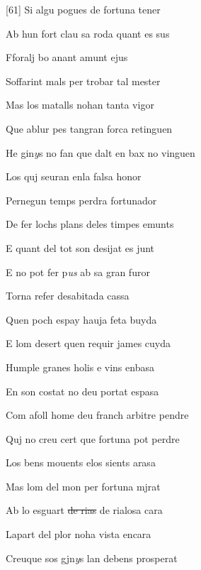\documentclass[12pt]{article}
\begin{document}
\begin{estrofa}

 [61] Si algu pogues de fortuna tener

 Ab hun fort clau sa roda quant es sus

 Fforalj bo anant amunt ejus

 Soffarint mals per trobar tal mester

 Mas los matalls nohan tanta vigor

 Que ablur pes tangran forca retinguen

 He gin\textit{y}s no fan que dalt en bax no vinguen

 Los quj seuran enla falsa honor

\end{estrofa}



\begin{estrofa}

 Pernegun temps perdra fortunador

 De fer lochs plans deles timpes emunts

 E quant del tot son desijat es junt

 E no pot fer p\textit{us }ab sa gran furor

 Torna refer desabitada cassa

 Quen poch espay hauja feta buyda

 E lom desert quen requir james cuyda

 Humple granes holis e vins enbasa

\end{estrofa}



\begin{estrofa}

 En son costat no deu portat espasa

 Com afoll home deu franch arbitre pendre

 Quj no creu cert que fortuna pot perdre

 Los bens mouents elos sients arasa

 Mas lom del mon per fortuna mjrat

 Ab lo esguart \sout{de rias} de rialosa cara

 Lapart del plor noha vista encara

 Creuque sos gjn\textit{y}s lan debens prosperat

\end{estrofa}
\end{document}
